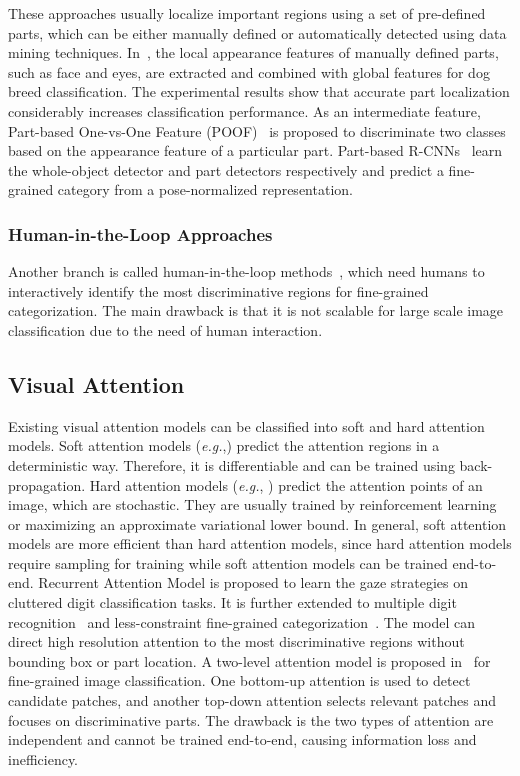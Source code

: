 \documentclass[journal]{IEEEtran}
\begin{document}
These approaches usually localize important regions using a set of pre-defined parts, which can be either manually defined or automatically detected using data mining techniques. In~\cite{Liu2012}, the local appearance features of manually defined parts, such as face and eyes, are extracted and combined with global features for dog breed classification. The experimental results show that accurate part localization considerably increases classification performance. As an intermediate feature, Part-based One-vs-One Feature (POOF)~\cite{poof} is proposed to discriminate two classes based on the appearance feature of a particular part. Part-based R-CNNs~\cite{part-based-rcnn} learn the whole-object detector and part detectors respectively and predict a fine-grained category from a pose-normalized representation.

\subsubsection{Human-in-the-Loop Approaches}

Another branch is called human-in-the-loop methods~\cite{Branson2010, crowdsourcing_fine_grained, wah:similarity}, which need humans to interactively identify the most discriminative regions for fine-grained categorization. The main drawback is that it is not scalable for large scale image classification due to the need of human interaction.

\subsection{Visual Attention}
Existing visual attention models can be classified into soft and hard attention models. Soft attention models (\textit{e.g.},\cite{action_recognition, Jaderberg:2015vo}) predict the attention regions in a deterministic way. Therefore, it is differentiable and can be trained using back-propagation. Hard attention models (\textit{e.g.}, \cite{fully_convolutional_attention, Xu:2015ut, ram, multiple-object_visual-attention, attention_categorization}) predict the attention points of an image, which are stochastic. They are usually trained by reinforcement learning \cite{reinforcement} or maximizing an approximate variational lower bound. In general, soft attention models are more efficient than hard attention models, since hard attention models require sampling for training while soft attention models can be trained end-to-end.
Recurrent Attention Model \cite{ram} is proposed to learn the gaze strategies on cluttered digit classification tasks. It is further extended to multiple digit recognition~\cite{multiple-object_visual-attention} and less-constraint fine-grained categorization~\cite{attention_categorization}. The model can direct high resolution attention to the most discriminative regions without bounding box or part location. A two-level attention model is proposed in~\cite{two_level_attention} for fine-grained image classification. One bottom-up attention is used to detect candidate patches, and another top-down attention selects relevant patches and focuses on discriminative parts. The drawback is the two types of attention are independent and cannot be trained end-to-end, causing information loss and inefficiency.
\end{document}
